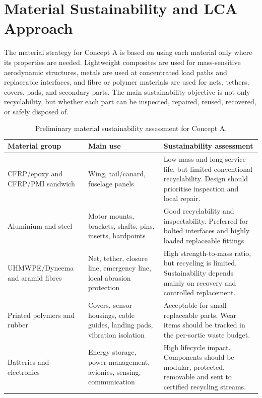 \section{Material Sustainability and LCA Approach}
\label{sec:material_sustainability_lca}

The material strategy for Concept A is based on using each material only where its properties are needed. Lightweight composites are used for mass-sensitive aerodynamic structures, metals are used at concentrated load paths and replaceable interfaces, and fibre or polymer materials are used for nets, tethers, covers, pads, and secondary parts. The main sustainability objective is not only recyclability, but whether each part can be inspected, repaired, reused, recovered, or safely disposed of.

\begin{table}[H]
\centering
\footnotesize
\caption{Preliminary material sustainability assessment for Concept A.}
\label{tab:material_sustainability_conceptA}
\renewcommand{\arraystretch}{1.2}
\setlength{\tabcolsep}{4pt}
\begin{tabularx}{\textwidth}{@{}p{}p{}X@{}}
\toprule
\textbf{Material group} & \textbf{Main use} & \textbf{Sustainability assessment} \\
\midrule
CFRP/epoxy and CFRP/PMI sandwich
& Wing, tail/canard, fuselage panels
& Low mass and long service life, but limited conventional recyclability. Design should prioritise inspection and local repair. \\

Aluminium and steel
& Motor mounts, brackets, shafts, pins, inserts, hardpoints
& Good recyclability and inspectability. Preferred for bolted interfaces and highly loaded replaceable fittings. \\

UHMWPE/Dyneema and aramid fibres
& Net, tether, closure line, emergency line, local abrasion protection
& High strength-to-mass ratio, but recycling is limited. Sustainability depends mainly on recovery and controlled replacement. \\

Printed polymers and rubber
& Covers, sensor housings, cable guides, landing pads, vibration isolation
& Acceptable for small replaceable parts. Wear items should be tracked in the per-sortie waste budget. \\

Batteries and electronics
& Energy storage, power management, avionics, sensing, communication
& High lifecycle impact. Components should be modular, protected, removable and sent to certified recycling streams. \\
\bottomrule
\end{tabularx}
\end{table}

